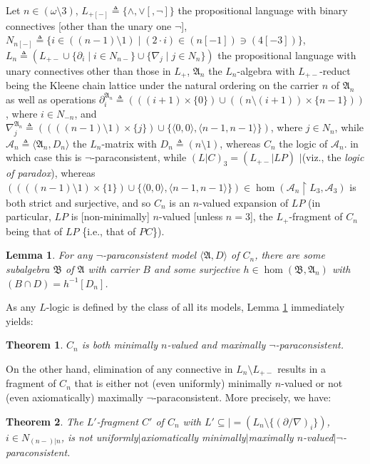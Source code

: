 \documentclass[bsl,meeting]{asl}
\newcommand{\mf}[1]{\mathfrak{#1}}
\newcommand{\mc}[1]{\mathcal{#1}}
\newcommand{\couple}[2]{\langle{#1},{#2}\rangle}
\newcommand{\inverse}[1]{{#1}^{-1}}
\newcommand{\restr}{{\upharpoonright}}
\newtheorem{lemma}{Lemma}
\newtheorem{theorem}{Theorem}
\begin{document}
Let $n\in(\omega\setminus3)$,
$L_{+[-]}\triangleq\{\land,\lor[,\neg]\}$
the propositional language with binary connectives
[other than the unary one $\neg$],
$N_{n[-]}\triangleq\{i\in((n-1)\setminus1)\mid(2\cdot
i)\in(n[-1])\ni(4[-3])\}$,
$L_n\triangleq(L_{+-}\cup\{\partial_i\mid i\in N_{n-}\}\cup
\{\nabla_j\mid j\in N_n\})$
the propositional language with unary connectives
other than those in $L_+$,
$\mf{A}_n$ the $L_n$-algebra with $L_{+-}$-reduct
being the Kleene chain lattice under the natural ordering
on the carrier $n$ of $\mf{A}_n$ as well as operations
$\partial_i^{\mf{A}_n}\triangleq(((i+1)\times\{0\})\cup((n\setminus(i+1))\times\{n-1\}))$,
where $i\in N_{-n}$, and $\nabla_j^{\mf{A}_n}\triangleq
((((n-1)\setminus1)\times\{j\})\cup\{\couple{0}{0},\couple{n-1}{n-1}\})$,
where $j\in N_n$,
while $\mc{A}_n\triangleq\couple{\mf{A}_n}{D_n}$ the $L_n$-matrix
with $D_n\triangleq(n\setminus1)$, whereas
$C_n$ the logic of $\mc{A}_n$.
in which case this is $\neg$-paraconsistent,
while $(L|C)_3=(L_{+-}|LP)$ $|$(viz., the {\em logic of
paradox\/}),
whereas $((((n-1)\setminus1)\times\{1\})\cup\{\couple{0}{0},\couple{n-1}{n-1}\})
\in\hom(\mc{A}_n\restr L_3,\mc{A}_3)$ is both strict and
surjective, and so $C_n$ is an $n$-valued expansion of $LP$
(in particular, $LP$ is [non-minimally] $n$-valued [unless
$n=3$], the $L_+$-fragment of $C_n$ being that of $LP$
\{i.e., that of $PC$\}).

\begin{lemma} %
\label{key-lem}
For any\/ $\neg$-paraconsistent model\/ $\couple{\mf{A}}{D}$ of\/
$C_n$,
there are some
subalgebra\/ $\mf{B}$ of\/ $\mf{A}$ with carrier\/ $B$
and some surjective $h\in\hom(\mf{B},\mf{A}_n)$
with\/ $(B\cap D)=\inverse{h}[D_n]$.
\end{lemma}

As any $L$-logic is defined by the class of all its models,
Lemma \ref{key-lem} immediately yields:

\begin{theorem}
\label{main-thm}
$C_n$ is both minimally $n$-valued and maximally\/
$\neg$-paraconsistent.
\end{theorem}

On the other hand, elimination of any connective in $L_n\setminus
L_{+-}$ results in a fragment of $C_n$ that is either
not (even uniformly)
minimally $n$-valued or not
(even axiomatically) maximally $\neg$-paraconsistent.
More precisely, we have:

\begin{theorem}
\label{non-thm}
The\/ $L'$-fragment\/ $C'$ of\/ $C_n$
with\/
$L'\subseteq|=(L_n\setminus\{(\partial/\nabla)_i\})$,
$i\in N_{(n-)|n}$,
is not
uniformly\/$|$axiomatically minimally\/$|$maximally
$n$-valued\/$|\neg$-paraconsistent.
\end{theorem}
\end{document}
